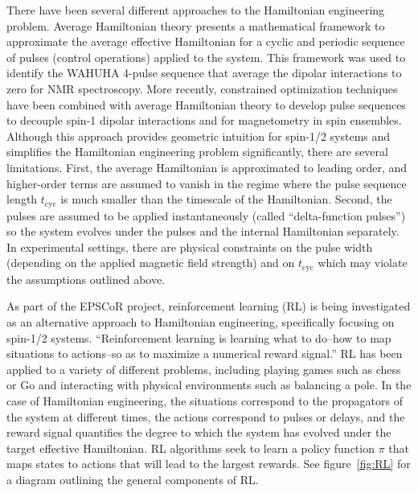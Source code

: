 \documentclass{article}
\begin{document}
There have been several different approaches to the Hamiltonian engineering problem.
Average Hamiltonian theory\cite{PhysRev.175.453} presents a mathematical framework to approximate the average effective Hamiltonian for a cyclic and periodic sequence of pulses (control operations) applied to the system.
This framework was used to identify the WAHUHA 4-pulse sequence\cite{PhysRevLett.20.180} that average the dipolar interactions to zero for NMR spectroscopy. More recently, constrained optimization techniques have been combined with average Hamiltonian theory to develop pulse sequences to decouple spin-1 dipolar interactions\cite{PhysRevLett.119.183603} and for magnetometry in spin ensembles\cite{O_Keeffe_2019}.
Although this approach provides geometric intuition for spin-1/2 systems and simplifies the Hamiltonian engineering problem significantly, there are several limitations. First, the average Hamiltonian is approximated to leading order, and higher-order terms are assumed to vanish in the regime where the pulse sequence length $t_\text{cyc}$ is much smaller than the timescale of the Hamiltonian. Second, the pulses are assumed to be applied instantaneously (called ``delta-function pulses'') so the system evolves under the pulses and the internal Hamiltonian separately.
In experimental settings, there are physical constraints on the pulse width (depending on the applied magnetic field strength) and on $t_\text{cyc}$ which may violate the assumptions outlined above.

As part of the EPSCoR project, reinforcement learning (RL) is being investigated as an alternative approach to Hamiltonian engineering, specifically focusing on spin-1/2 systems.
``Reinforcement learning is learning what to do--how to map situations to actions--so as to maximize a numerical reward signal.''\cite{sutton2018reinforcement} RL has been applied to a variety of different problems, including playing games such as chess or Go\cite{Silver1140} and interacting with physical environments such as balancing a pole\cite{lillicrap2015continuous}. In the case of Hamiltonian engineering, the situations correspond to the propagators of the system at different times, the actions correspond to pulses or delays, and the reward signal quantifies the degree to which the system has evolved under the target effective Hamiltonian.
RL algorithms seek to learn a policy function $\pi$ that maps states to actions that will lead to the largest rewards. See figure~\ref{fig:RL} for a diagram outlining the general components of RL.
\end{document}
